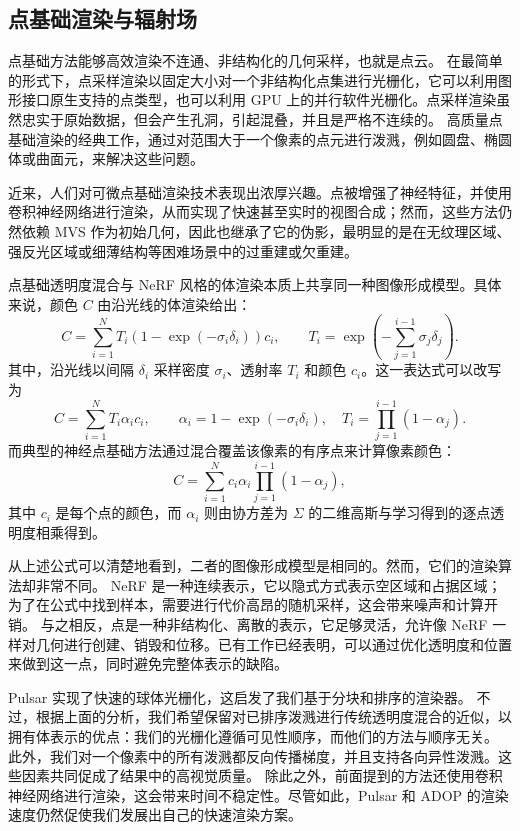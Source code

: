 \subsection{点基础渲染与辐射场}

点基础方法能够高效渲染不连通、非结构化的几何采样，也就是点云。
在最简单的形式下，点采样渲染以固定大小对一个非结构化点集进行光栅化，它可以利用图形接口原生支持的点类型，也可以利用 GPU 上的并行软件光栅化。点采样渲染虽然忠实于原始数据，但会产生孔洞，引起混叠，并且是严格不连续的。
高质量点基础渲染的经典工作，通过对范围大于一个像素的点元进行泼溅，例如圆盘、椭圆体或曲面元，来解决这些问题。

近来，人们对可微点基础渲染技术表现出浓厚兴趣。点被增强了神经特征，并使用卷积神经网络进行渲染，从而实现了快速甚至实时的视图合成；然而，这些方法仍然依赖 MVS 作为初始几何，因此也继承了它的伪影，最明显的是在无纹理区域、强反光区域或细薄结构等困难场景中的过重建或欠重建。

点基础透明度混合与 NeRF 风格的体渲染本质上共享同一种图像形成模型。具体来说，颜色 \(C\) 由沿光线的体渲染给出：
\[
C=\sum_{i=1}^{N} T_i\left(1-\exp\left(-\sigma_i\delta_i\right)\right)c_i,
\qquad
T_i=\exp\left(-\sum_{j=1}^{i-1}\sigma_j\delta_j\right).
\]
其中，沿光线以间隔 \(\delta_i\) 采样密度 \(\sigma_i\)、透射率 \(T_i\) 和颜色 \(c_i\)。这一表达式可以改写为
\[
C=\sum_{i=1}^{N} T_i\alpha_i c_i,
\qquad
\alpha_i=1-\exp(-\sigma_i\delta_i),\quad
T_i=\prod_{j=1}^{i-1}(1-\alpha_j).
\]
而典型的神经点基础方法通过混合覆盖该像素的有序点来计算像素颜色：
\[
C=\sum_{i=1}^{N} c_i\alpha_i\prod_{j=1}^{i-1}(1-\alpha_j),
\]
其中 \(c_i\) 是每个点的颜色，而 \(\alpha_i\) 则由协方差为 \(\Sigma\) 的二维高斯与学习得到的逐点透明度相乘得到。

从上述公式可以清楚地看到，二者的图像形成模型是相同的。然而，它们的渲染算法却非常不同。
NeRF 是一种连续表示，它以隐式方式表示空区域和占据区域；为了在公式中找到样本，需要进行代价高昂的随机采样，这会带来噪声和计算开销。
与之相反，点是一种非结构化、离散的表示，它足够灵活，允许像 NeRF 一样对几何进行创建、销毁和位移。已有工作已经表明，可以通过优化透明度和位置来做到这一点，同时避免完整体表示的缺陷。

Pulsar 实现了快速的球体光栅化，这启发了我们基于分块和排序的渲染器。
不过，根据上面的分析，我们希望保留对已排序泼溅进行传统透明度混合的近似，以拥有体表示的优点：我们的光栅化遵循可见性顺序，而他们的方法与顺序无关。
此外，我们对一个像素中的所有泼溅都反向传播梯度，并且支持各向异性泼溅。这些因素共同促成了结果中的高视觉质量。
除此之外，前面提到的方法还使用卷积神经网络进行渲染，这会带来时间不稳定性。尽管如此，Pulsar 和 ADOP 的渲染速度仍然促使我们发展出自己的快速渲染方案。

